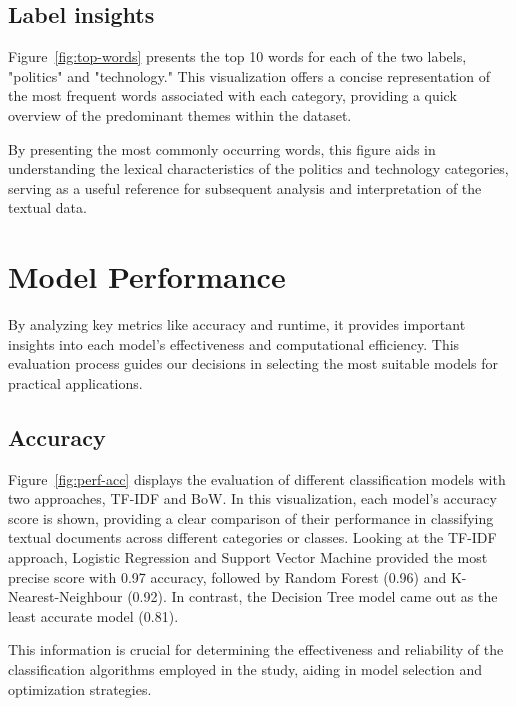 \subsection{Label insights}


Figure~\ref{fig:top-words} presents the top 10 words for each of the two labels, "politics" and "technology." This visualization offers a concise representation of the most frequent words associated with each category, providing a quick overview of the predominant themes within the dataset.

By presenting the most commonly occurring words, this figure aids in understanding the lexical characteristics of the politics and technology categories, serving as a useful reference for subsequent analysis and interpretation of the textual data.

\section{Model Performance}

By analyzing key metrics like accuracy and runtime, it provides important insights into each model's effectiveness and computational efficiency. This evaluation process guides our decisions in selecting the most suitable models for practical applications.

\break

\subsection{Accuracy}


Figure~\ref{fig:perf-acc} displays the evaluation of different classification models with two approaches, TF-IDF and BoW. In this visualization, each model's accuracy score is shown, providing a clear comparison of their performance in classifying textual documents across different categories or classes. Looking at the TF-IDF approach, Logistic Regression and Support Vector Machine provided the most precise score with 0.97 accuracy, followed by Random Forest (0.96) and K-Nearest-Neighbour (0.92). In contrast, the Decision Tree model came out as the least accurate model (0.81).

This information is crucial for determining the effectiveness and reliability of the classification algorithms employed in the study, aiding in model selection and optimization strategies.

